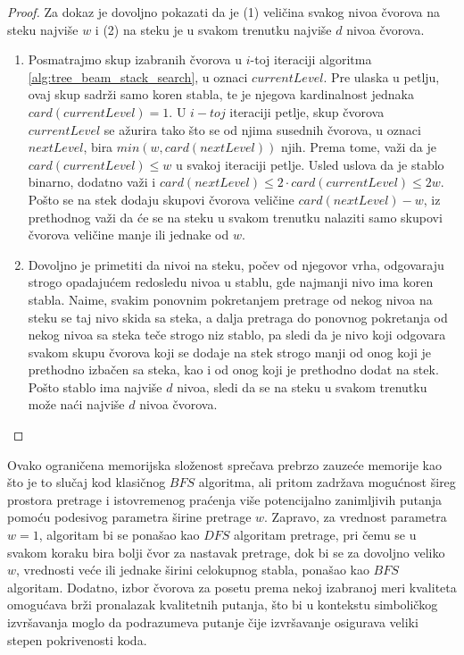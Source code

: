 \documentclass[a4paper]{article}
\begin{document}
\begin{proof}
Za dokaz je dovoljno pokazati da je (1) veličina svakog nivoa čvorova na steku najviše $w$ i (2) na steku je u svakom trenutku najviše $d$ nivoa čvorova.
\begin{enumerate}
    \item Posmatrajmo skup izabranih čvorova u $i$-toj iteraciji algoritma \ref{alg:tree_beam_stack_search}, u oznaci $currentLevel$. Pre ulaska u petlju, ovaj skup sadrži samo koren stabla, te je njegova kardinalnost jednaka $card(currentLevel) = 1$. U $i-toj$ iteraciji petlje, skup čvorova $currentLevel$ se ažurira tako što se od njima susednih čvorova, u oznaci $nextLevel$, bira $min(w, card(nextLevel))$ njih. Prema tome, važi da je $card(currentLevel) \leq w$ u svakoj iteraciji petlje. Usled uslova da je stablo binarno, dodatno važi i $card(nextLevel) \leq 2 \cdot card(currentLevel) \leq 2w$. Pošto se na stek dodaju skupovi čvorova veličine $card(nextLevel) - w$, iz prethodnog važi da će se na steku u svakom trenutku nalaziti samo skupovi čvorova veličine manje ili jednake od $w$.

    \item Dovoljno je primetiti da nivoi na steku, počev od njegovor vrha, odgovaraju strogo opadajućem redosledu nivoa u stablu, gde najmanji nivo ima koren stabla. Naime, svakim ponovnim pokretanjem pretrage od nekog nivoa na steku se taj nivo skida sa steka, a dalja pretraga do ponovnog pokretanja od nekog nivoa sa steka teče strogo niz stablo, pa sledi da je nivo koji odgovara svakom skupu čvorova koji se dodaje na stek strogo manji od onog koji je prethodno izbačen sa steka, kao i od onog koji je prethodno dodat na stek. Pošto stablo ima najviše $d$ nivoa, sledi da se na steku u svakom trenutku može naći najviše $d$ nivoa čvorova.
\end{enumerate}
\end{proof}

Ovako ograničena memorijska složenost sprečava prebrzo zauzeće memorije kao što je to slučaj kod klasičnog $BFS$ algoritma, ali pritom zadržava mogućnost šireg prostora pretrage i istovremenog praćenja više potencijalno zanimljivih putanja pomoću podesivog parametra širine pretrage $w$. Zapravo, za vrednost parametra $w = 1$, algoritam bi se ponašao kao $DFS$ algoritam pretrage, pri čemu se u svakom koraku bira bolji čvor za nastavak pretrage, dok bi se za dovoljno veliko $w$, vrednosti veće ili jednake širini celokupnog stabla, ponašao kao $BFS$ algoritam. Dodatno, izbor čvorova za posetu prema nekoj izabranoj meri kvaliteta omogućava brži pronalazak kvalitetnih putanja, što bi u kontekstu simboličkog izvršavanja moglo da podrazumeva putanje čije izvršavanje osigurava veliki stepen pokrivenosti koda.
\end{document}
